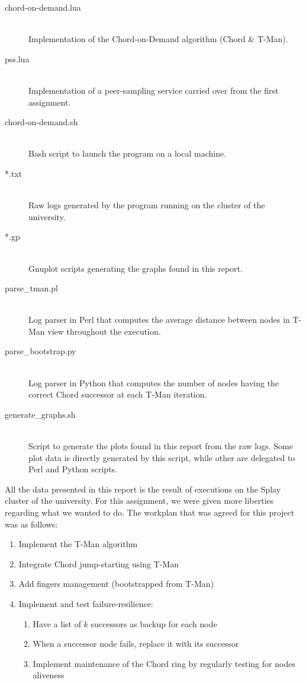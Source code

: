 \documentclass[11pt,a4paper,parskip=half]{scrartcl}
\begin{document}
\begin{description}
\item[chord-on-demand.lua]\hfill\\ Implementation of the Chord-on-Demand algorithm (Chord \& T-Man).
\item[pss.lua]\hfill\\ Implementation of a peer-sampling service carried over from the first assignment.
\item[chord-on-demand.sh]\hfill\\ Bash script to launch the program on a local machine.
\item[*.txt]\hfill\\ Raw logs generated by the program running on the cluster of the university.
\item[*.gp]\hfill\\ Gnuplot scripts generating the graphs found in this report.
\item[parse\_tman.pl]\hfill\\ Log parser in Perl that computes the average distance between nodes in T-Man view throughout the execution.
\item[parse\_bootstrap.py]\hfill\\ Log parser in Python that computes the number of nodes having the correct Chord successor at each T-Man iteration.
\item[generate\_graphs.sh]\hfill\\ Script to generate the plots found in this report from the raw logs. Some plot data is directly generated by this script, while other are delegated to Perl and Python scripts.
\end{description}

All the data presented in this report is the result of executions on the Splay cluster of the university.
For this assignment, we were given more liberties regarding what we wanted to do.
The workplan that was agreed for this project was as follows:

\begin{enumerate}
\item\label{work:tman} Implement the T-Man algorithm
\item\label{work:bootstrap} Integrate Chord jump-starting using T-Man
\item\label{work:fingers} Add fingers management (bootstrapped from T-Man)
\item\label{work:failure} Implement and test failure-resilience:
\begin{enumerate}
\item\label{work:ksuccs} Have a list of $k$ successors as backup for each node
\item\label{work:fallback} When a successor node fails, replace it with its successor
\item\label{work:ping} Implement maintenance of the Chord ring by regularly testing for nodes aliveness
\end{enumerate}
\end{enumerate}
\end{document}
